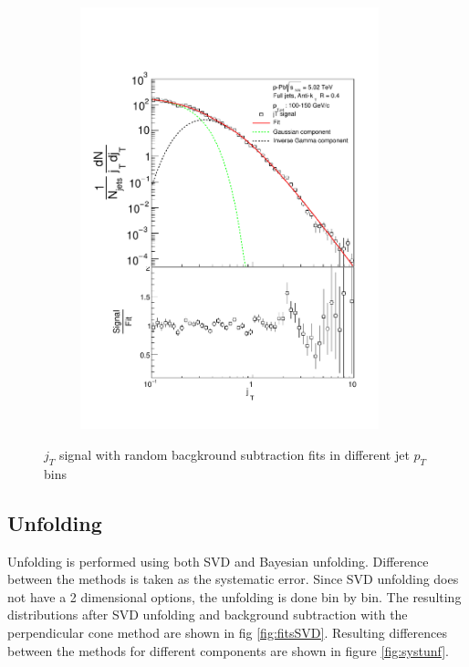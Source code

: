 \begin{figure}
\begin{subfigure}{0.24\textwidth}
\includegraphics[width=0.95\textwidth]{results/JetConejTSignalFit/JetConejTSignalFitNFin00JetPt07randomBgBayes}
\end{subfigure}
\caption{$j_T$ signal with random bacgkround subtraction fits in different jet $p_T$ bins}
\label{fig:fitsrandombg}
\end{figure}

\subsection{Unfolding}
Unfolding is performed using both SVD and Bayesian unfolding. Difference between the methods is taken as the systematic error. Since SVD unfolding does not have a 2 dimensional options, the unfolding is done bin by bin. The resulting distributions after SVD unfolding and background subtraction with the perpendicular cone method are shown in fig \ref{fig:fitsSVD}. Resulting differences between the methods for different components are shown in figure \ref{fig:systunf}.

